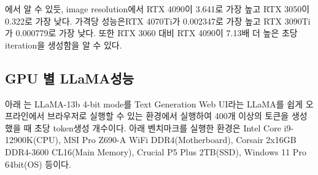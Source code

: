 \tableautorefname{\ref{stableresolutiongpubenchmarktable}}에서 알 수 있듯, image resolution에서 RTX 4090이 3.641로 가장 높고 RTX 3050이 0.322로 가장 낮다. 가격당 성능은RTX 4070Ti가 0.002347로 가장 높고 RTX 3090Ti가 0.000779로 가장 낮다. 또한 RTX 3060 대비 RTX 4090이 7.13배 더 높은 초당 iteration을 생성함을 알 수 있다.

\subsection{GPU 별 LLaMA성능}
아래 \tableautorefname{\ref{llamabenchmarktable}}\cite{jarred2023howtorun}는 LLaMA-13b 4-bit mode를 Text Generation Web UI라는 LLaMA를 쉽게 오프라인에서 브라우저로 실행할 수 있는 환경에서 실행하여 400개 이상의 토큰을 생성했을 때 초당 token생성 개수이다. 아래 벤치마크를 실행한 환경은 Intel Core i9-12900K(CPU), MSI Pro Z690-A WiFi DDR4(Motherboard), Corsair 2x16GB DDR4-3600 CL16(Main Memory), Crucial P5 Plus 2TB(SSD), Windows 11 Pro 64bit(OS) 등이다.

